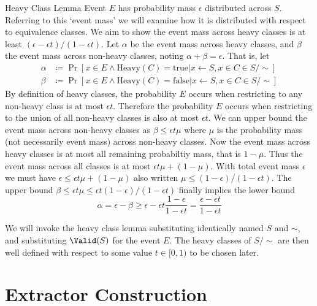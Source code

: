 \begin{lemma}{Heavy Class Lemma}
    \proof
    Event $E$ has probability mass $\epsilon$ distributed across $S$.
    Referring to this `event mass' we will examine how it is distributed with respect to equivalence classes.
    We aim to show the event mass across heavy classes is at least $(\epsilon-\epsilon t)/(1-\epsilon t)$.
    Let $\alpha$ be the event mass across heavy classes, and $\beta$ the event mass across non-heavy classes, noting $\alpha+\beta=\epsilon$.
    That is, let
    \begin{align}
        \alpha &\coloneq \Pr[
            x\in E \land\text{Heavy}(C)=\text{true}
            |x\leftarrow S, x\in C\in S/\sim
        ] \\
        \beta &\coloneq \Pr[
            x\in E \land\text{Heavy}(C)=\text{false}
            |x\leftarrow S, x\in C\in S/\sim
        ]
    \end{align}
    By definition of heavy classes, the probability $E$ occurs when restricting to any non-heavy class is at most $\epsilon t$.
    Therefore the probability $E$ occurs when restricting to the union of all non-heavy classes is also at most $\epsilon t$.
    We can upper bound the event mass across non-heavy classes as $\beta\leq\epsilon t\mu$ where $\mu$ is the probability mass (not necessarily event mass) across non-heavy classes.
    Now the event mass across heavy classes is at most all remaining probabiltiy mass, that is $1-\mu$.
    Thus the event mass across all classes is at most $\epsilon t\mu+(1-\mu)$.
    With total event mass $\epsilon$ we must have $\epsilon\leq\epsilon t\mu+(1-\mu)$ also written $\mu\leq(1-\epsilon)/(1-\epsilon t)$.
    The upper bound $\beta\leq\epsilon t\mu\leq\epsilon t(1-\epsilon)/(1-\epsilon t)$ finally implies the lower bound
    \begin{equation}
        \alpha = \epsilon - \beta
        \geq \epsilon - \epsilon t\frac{1-\epsilon}{1-\epsilon t}
        = \frac{\epsilon - \epsilon t}{1 - \epsilon t}
    \end{equation}
\end{lemma}

We will invoke the heavy class lemma substituting identically named $S$ and $\sim$, and substituting $\Valid(S)$ for the event $E$.
The heavy classes of $S/\sim$ are then well defined with respect to some value $t\in[0,1)$ to be chosen later.


\section{Extractor Construction}

